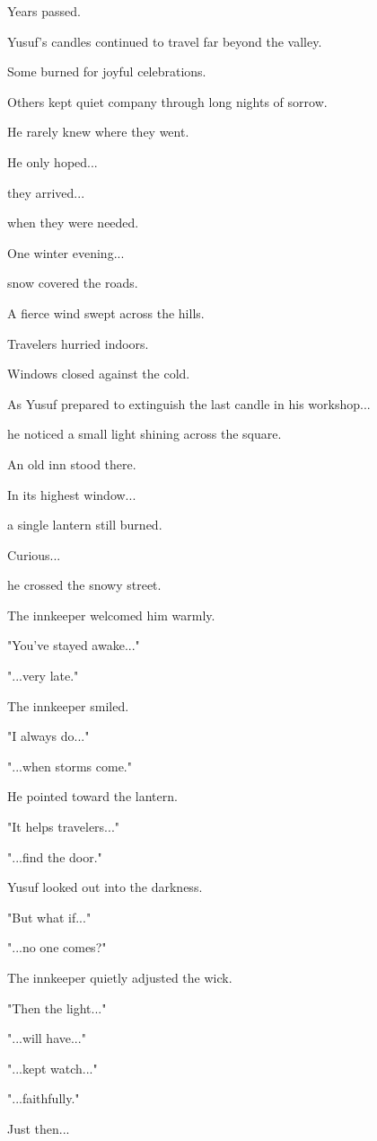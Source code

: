 \documentclass[12pt,openany]{book}
\begin{document}
Years passed.

Yusuf's candles continued to travel far beyond the valley.

Some burned for joyful celebrations.

Others kept quiet company through long nights of sorrow.

He rarely knew where they went.

He only hoped...

they arrived...

when they were needed.

One winter evening...

snow covered the roads.

A fierce wind swept across the hills.

Travelers hurried indoors.

Windows closed against the cold.

As Yusuf prepared to extinguish the last candle in his workshop...

he noticed a small light shining across the square.

An old inn stood there.

In its highest window...

a single lantern still burned.

Curious...

he crossed the snowy street.

The innkeeper welcomed him warmly.

"You've stayed awake..."

"...very late."

The innkeeper smiled.

"I always do..."

"...when storms come."

He pointed toward the lantern.

"It helps travelers..."

"...find the door."

Yusuf looked out into the darkness.

"But what if..."

"...no one comes?"

The innkeeper quietly adjusted the wick.

"Then the light..."

"...will have..."

"...kept watch..."

"...faithfully."

Just then...
\end{document}
